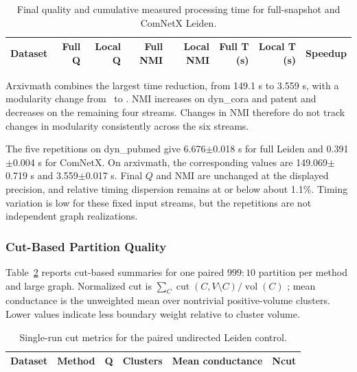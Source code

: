 \documentclass{ieeeaccess}
\begin{document}
\begin{table}[t]
\centering
\caption{Final quality and cumulative measured processing time for full-snapshot
and ComNetX Leiden.}
\label{tab:short}
\setlength{\tabcolsep}{4.1pt}
\small
\begin{tabular}{@{}lrrrrrrr@{}}
\toprule
\textbf{Dataset} & \textbf{Full Q} & \textbf{Local Q} &
\textbf{Full NMI} & \textbf{Local NMI} &
\textbf{Full T (s)} & \textbf{Local T (s)} &
\textbf{Speedup} \\
\midrule

\end{tabular}
\end{table}

Arxivmath combines the largest time reduction, from 149.1 s to 3.559 s, with
a modularity change from \ArxivShortFullQ\ to \ArxivShortLocalQ. NMI increases
on dyn\_cora and patent and decreases on the remaining four streams. Changes in
NMI therefore do not track changes in modularity consistently across the six
streams.

The five repetitions on dyn\_pubmed give 6.676$\pm$0.018 s for full Leiden and
0.391$\pm$0.004 s for ComNetX. On arxivmath, the corresponding values are
149.069$\pm$0.719 s and 3.559$\pm$0.017 s. Final $Q$ and NMI are unchanged at
the displayed precision, and relative timing dispersion remains at or below
about 1.1\%. Timing variation is low for these fixed input streams, but the
repetitions are not independent graph realizations.

\subsubsection{Cut-Based Partition Quality}
Table~\ref{tab:cut_metrics} reports cut-based summaries for one paired
$999{:}10$ partition per method and large graph. Normalized cut is
$\sum_C \operatorname{cut}(C,V\setminus C)/\operatorname{vol}(C)$
\cite{Shi2000}; mean conductance is the unweighted mean over nontrivial
positive-volume clusters. Lower values indicate less boundary weight relative
to cluster volume.

\begin{table}[t]
\centering
\caption{Single-run cut metrics for the paired undirected Leiden control.}
\label{tab:cut_metrics}
\setlength{\tabcolsep}{5.0pt}
\small
\begin{tabular}{@{}llrrrr@{}}
\toprule
\textbf{Dataset} & \textbf{Method} & \textbf{Q} &
\textbf{Clusters} & \textbf{Mean conductance} & \textbf{Ncut} \\
\midrule

\end{tabular}
\end{table}
\end{document}
